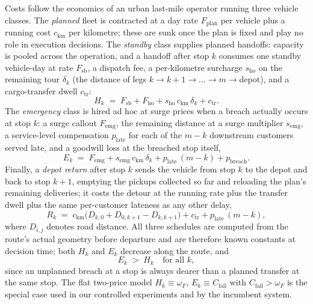 \documentclass[preprint,authoryear,12pt]{elsarticle}
\theoremstyle{definition}
\theoremstyle{remark}
\begin{document}
Costs follow the economics of an urban last-mile operator running three
vehicle classes. The \emph{planned} fleet is contracted at a day rate
$F_{\mathrm{plan}}$ per vehicle plus a running cost $c_{\mathrm{km}}$
per kilometre; these are sunk once the plan is fixed and play no role in
execution decisions. The \emph{standby} class supplies planned handoffs:
capacity is pooled across the operation, and a handoff after stop $k$
consumes one standby vehicle-day at rate $F_{\mathrm{sb}}$, a dispatch
fee, a per-kilometre surcharge $s_{\mathrm{ho}}$ on the remaining tour
$\delta_k$ (the distance of legs $k{\to}k{+}1{\to}\dots{\to}m{\to}$depot),
and a cargo-transfer dwell $c_{\mathrm{tr}}$:
\begin{equation}\label{eq:handoffprice}
  H_k \;=\; F_{\mathrm{sb}} + F_{\mathrm{ho}}
       + s_{\mathrm{ho}}\, c_{\mathrm{km}}\, \delta_k + c_{\mathrm{tr}} .
\end{equation}
The \emph{emergency} class is hired ad hoc at surge prices when a breach
actually occurs at stop $k$: a surge callout $F_{\mathrm{emg}}$, the
remaining distance at a surge multiplier $s_{\mathrm{emg}}$, a
service-level compensation $p_{\mathrm{late}}$ for each of the $m-k$
downstream customers served late, and a goodwill loss at the breached
stop itself,
\begin{equation}\label{eq:emergencyprice}
  E_k \;=\; F_{\mathrm{emg}}
       + s_{\mathrm{emg}}\, c_{\mathrm{km}}\, \delta_k
       + p_{\mathrm{late}}\,(m-k) + p_{\mathrm{breach}} .
\end{equation}
Finally, a \emph{depot return} after stop $k$ sends the vehicle from
stop $k$ to the depot and back to stop $k{+}1$, emptying the pickups
collected so far and reloading the plan's remaining deliveries; it costs
the detour at the running rate plus the transfer dwell plus the same
per-customer lateness as any other delay,
\begin{equation}\label{eq:restockprice}
  R_k \;=\; c_{\mathrm{km}}\bigl(D_{k,0} + D_{0,k+1} - D_{k,k+1}\bigr)
       + c_{\mathrm{tr}} + p_{\mathrm{late}}\,(m-k) ,
\end{equation}
where $D_{i,j}$ denotes road distance. All three schedules are computed
from the route's actual geometry before departure and are therefore
known constants at decision time; both $H_k$ and $E_k$ decrease along
the route, and
\begin{equation}\label{eq:prices}
  E_k \;>\; H_k \quad\text{for all } k ,
\end{equation}
since an unplanned breach at a stop is always dearer than a planned
transfer at the same stop. The flat two-price model
$H_k \equiv \omega_F$, $E_k \equiv C_{\mathrm{fail}}$ with
$C_{\mathrm{fail}} > \omega_F$ is the special case used in our
controlled experiments and by the incumbent system.
\end{document}
